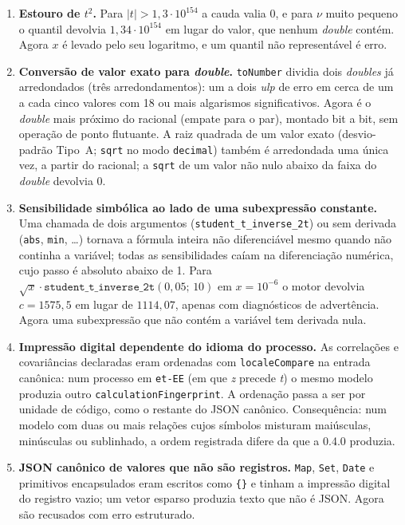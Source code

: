 \documentclass[11pt,a4paper]{article}
\newcommand{\previousVersion}{0.4.0}
\begin{document}
\begin{enumerate}[label=(\alph*)]
  \item \textbf{Estouro de \(t^2\).} Para \(|t| > 1{,}3 \cdot 10^{154}\) a cauda valia 0, e para \(\nu\) muito pequeno o quantil devolvia \(1{,}34 \cdot 10^{154}\) em lugar do valor, que nenhum \emph{double} contém. Agora \(x\) é levado pelo seu logaritmo, e um quantil não representável é erro.
  \item \textbf{Conversão de valor exato para \emph{double}.} \texttt{toNumber} dividia dois \emph{doubles} já arredondados (três arredondamentos): um a dois \emph{ulp} de erro em cerca de um a cada cinco valores com 18 ou mais algarismos significativos. Agora é o \emph{double} mais próximo do racional (empate para o par), montado bit a bit, sem operação de ponto flutuante. A raiz quadrada de um valor exato (desvio-padrão Tipo~A; \texttt{sqrt} no modo \texttt{decimal}) também é arredondada uma única vez, a partir do racional; a \texttt{sqrt} de um valor não nulo abaixo da faixa do \emph{double} devolvia 0.
  \item \textbf{Sensibilidade simbólica ao lado de uma subexpressão constante.} Uma chamada de dois argumentos (\texttt{student\_t\_inverse\_2t}) ou sem derivada (\texttt{abs}, \texttt{min}, \ldots) tornava a fórmula inteira não diferenciável mesmo quando não continha a variável; todas as sensibilidades caíam na diferenciação numérica, cujo passo é absoluto abaixo de 1. Para \(\sqrt{x} \cdot \texttt{student\_t\_inverse\_2t}(0{,}05;\,10)\) em \(x = 10^{-6}\) o motor devolvia \(c = 1575{,}5\) em lugar de \(1114{,}07\), apenas com diagnósticos de advertência. Agora uma subexpressão que não contém a variável tem derivada nula.
  \item \textbf{Impressão digital dependente do idioma do processo.} As correlações e covariâncias declaradas eram ordenadas com \texttt{localeCompare} na entrada canônica: num processo em \texttt{et-EE} (em que \emph{z} precede \emph{t}) o mesmo modelo produzia outro \texttt{calculationFingerprint}. A ordenação passa a ser por unidade de código, como o restante do JSON canônico. Consequência: num modelo com duas ou mais relações cujos símbolos misturam maiúsculas, minúsculas ou sublinhado, a ordem registrada difere da que a \previousVersion{} produzia.
  \item \textbf{JSON canônico de valores que não são registros.} \texttt{Map}, \texttt{Set}, \texttt{Date} e primitivos encapsulados eram escritos como \texttt{\{\}} e tinham a impressão digital do registro vazio; um vetor esparso produzia texto que não é JSON. Agora são recusados com erro estruturado.
\end{enumerate}
\end{document}
